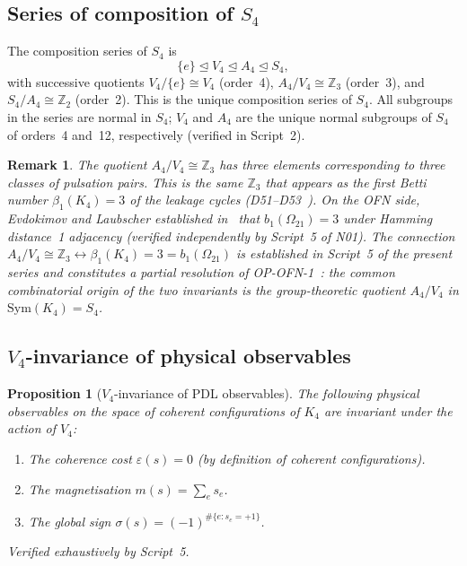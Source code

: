 \documentclass[11pt,a4paper]{article}
\newtheorem{proposition}{Proposition}[section]
\newtheorem{remark}{Remark}[section]
\newcommand{\Kfour}{K_4}
\begin{document}
\subsection{Series of composition of \texorpdfstring{$S_4$}{S4}}
\label{subsec:series}

The composition series of $S_4$ is
\begin{equation}
\{e\} \trianglelefteq V_4 \trianglelefteq A_4 \trianglelefteq S_4,
\label{eq:series}
\end{equation}
with successive quotients $V_4/\{e\} \cong V_4$ (order~4), $A_4/V_4 \cong \mathbb{Z}_3$ (order~3), and $S_4/A_4 \cong \mathbb{Z}_2$ (order~2). This is the unique composition series of $S_4$. All subgroups in the series are normal in $S_4$; $V_4$ and $A_4$ are the unique normal subgroups of $S_4$ of orders~4 and~12, respectively (verified in Script~2).

\begin{remark}
The quotient $A_4/V_4 \cong \mathbb{Z}_3$ has three elements corresponding to three classes of pulsation pairs. This is the same $\mathbb{Z}_3$ that appears as the first Betti number $\beta_1(\Kfour) = 3$ of the leakage cycles (D51--D53~\cite{PDL_D53}). On the OFN side, Evdokimov and Laubscher established in~\cite{PDL_N01} that $b_1(\Omega_{21}) = 3$ under Hamming distance~1 adjacency (verified independently by Script~5 of N01). The connection $A_4/V_4 \cong \mathbb{Z}_3 \leftrightarrow \beta_1(\Kfour) = 3 = b_1(\Omega_{21})$ is established in Script~5 of the present series and constitutes a partial resolution of OP-OFN-1~\cite{PDL_N01}: the common combinatorial origin of the two invariants is the group-theoretic quotient $A_4/V_4$ in $\mathrm{Sym}(\Kfour) = S_4$.
\end{remark}

\subsection{\texorpdfstring{$V_4$}{V4}-invariance of physical observables}
\label{subsec:V4_invariance}

\begin{proposition}[$V_4$-invariance of PDL observables]
\label{prop:V4_inv}
The following physical observables on the space of coherent configurations of $\Kfour$ are invariant under the action of $V_4$:
\begin{enumerate}[label=(\roman*)]
\item The coherence cost $\varepsilon(s) = 0$ (by definition of coherent configurations).
\item The magnetisation $m(s) = \sum_{e} s_e$.
\item The global sign $\sigma(s) = (-1)^{\#\{e : s_e = +1\}}$.
\end{enumerate}
Verified exhaustively by Script~5.
\end{proposition}
\end{document}
